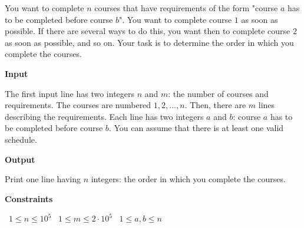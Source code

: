 You want to complete $n$ courses that have requirements of the form "course $a$ has to be completed before course $b$".
You want to complete course $1$ as soon as possible. If there are several ways to do this, you want then to complete course $2$ as soon as possible, and so on.
Your task is to determine the order in which you complete the courses.

\vspace{0.3cm}\noindent\textbf{Input}

The first input line has two integers $n$ and $m$: the number of courses and requirements. The courses are numbered $1,2,\dots,n$.
Then, there are $m$ lines describing the requirements. Each line has two integers $a$ and $b$: course $a$ has to be completed before course $b$.
You can assume that there is at least one valid schedule.

\vspace{0.3cm}\noindent\textbf{Output}

Print one line having $n$ integers: the order in which you complete the courses.

\vspace{0.3cm}\noindent\textbf{Constraints}

\textbullet\ $1 \le n \le 10^5$
\textbullet\ $1 \le m \le 2 \cdot 10^5$
\textbullet\ $1 \le a,b \le n$